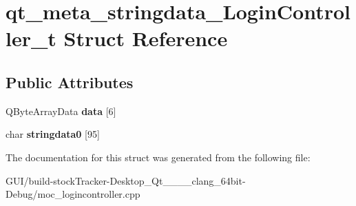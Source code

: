 \hypertarget{structqt__meta__stringdata___login_controller__t}{}\section{qt\+\_\+meta\+\_\+stringdata\+\_\+\+Login\+Controller\+\_\+t Struct Reference}
\label{structqt__meta__stringdata___login_controller__t}
\subsection*{Public Attributes}
\begin{DoxyCompactItemize}
\item 
\mbox{\label{structqt__meta__stringdata___login_controller__t_a574003d2fd89e11551bc020bb27b660e}} 
Q\+Byte\+Array\+Data {\bfseries data} \mbox{[}6\mbox{]}
\item 
\mbox{\label{structqt__meta__stringdata___login_controller__t_aa2148a1911add4c4dde96cb5465db0ce}} 
char {\bfseries stringdata0} \mbox{[}95\mbox{]}
\end{DoxyCompactItemize}


The documentation for this struct was generated from the following file\+:\begin{DoxyCompactItemize}
\item 
G\+U\+I/build-\/stock\+Tracker-\/\+Desktop\+\_\+\+Qt\+\_\+\_\+\_\+\_\+clang\+\_\+64bit-\/\+Debug/moc\+\_\+logincontroller.\+cpp\end{DoxyCompactItemize}
